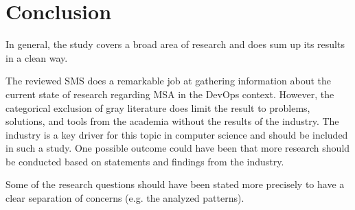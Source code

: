 \section{Conclusion}

In general, the study covers a broad
area of research and does sum up its results in a clean way.

The reviewed SMS does a remarkable job at gathering information
about the current state of research regarding MSA in the DevOps
context. However, the categorical exclusion of gray literature
does limit the result to problems, solutions, and tools from the
academia without the results of the industry. The industry is a key driver
for this topic in computer science and should be
included in such a study. One possible outcome could have been
that more research should be conducted based on statements and
findings from the industry.

Some of the research questions should have been stated more precisely
to have a clear separation of concerns (e.g. the analyzed patterns).


